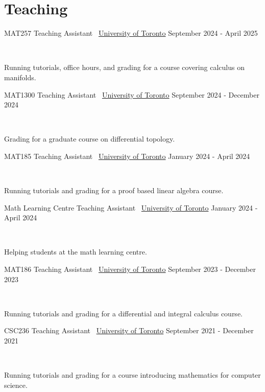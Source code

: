 \documentclass[]{style}
\begin{document}
\section{Teaching}

\begin{entrylist}

\vspace{1mm}

\entry
{MAT257 Teaching Assistant \ {\normalfont \underline{University of Toronto}}}
{September  2024 - April 2025}
{ ~ \vspace{-2.5mm}

Running tutorials, office hours, and grading for a course covering calculus on manifolds. 
}

\entry
{MAT1300 Teaching Assistant \ {\normalfont \underline{University of Toronto}}}
{September  2024 - December 2024}
{ ~ \vspace{-2.5mm}

Grading for a graduate course on differential topology.
}

\entry
{MAT185 Teaching Assistant \ {\normalfont \underline{University of Toronto}}}
{January  2024 - April 2024}
{ ~ \vspace{-2.5mm}

Running tutorials and grading for a proof based linear algebra course.
}

\entry
{Math Learning Centre Teaching Assistant \ {\normalfont \underline{University of Toronto}}}
{January  2024 - April 2024}
{ ~ \vspace{-2.5mm}

Helping students at the math learning centre.
}

\end{entrylist}

\newpage

\begin{entrylist}

\entry
{MAT186 Teaching Assistant \ {\normalfont \underline{University of Toronto}}}
{September 2023 - December 2023}
{ ~ \vspace{-2.5mm}

Running tutorials and grading for a differential and integral calculus course.
}


\entry
{CSC236 Teaching Assistant \ {\normalfont \underline{University of Toronto}}}
{September 2021 - December 2021}
{ ~ \vspace{-2.5mm}

Running tutorials and grading for a course introducing mathematics for computer science.
}

\end{entrylist}
\end{document}
